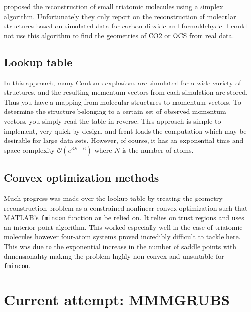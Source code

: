 \citet{Brichta09} proposed the reconstruction of small triatomic molecules using a simplex algorithm. Unfortunately they only report on the reconstruction of molecular structures based on simulated data for carbon dioxide and formaldehyde. I could not use this algorithm to find the geometries of CO2 or OCS from real data.

\subsection{Lookup table}
In this approach, many Coulomb explosions are simulated for a wide variety of structures, and the resulting momentum vectors from each simulation are stored. Thus you have a mapping from molecular structures to momentum vectors. To determine the structure belonging to a certain set of observed momentum vectors, you simply read the table in reverse. This approach is simple to implement, very quick by design, and front-loads the computation which may be desirable for large data sets. However, of course, it has an exponential time and space complexity $\mathcal{O}(e^{3N-6})$ where $N$ is the number of atoms.

\subsection{Convex optimization methods}
Much progress was made over the lookup table by treating the geometry reconstruction problem as a constrained nonlinear convex optimization such that MATLAB's \texttt{fmincon} function an be relied on. It relies on trust regions and uses an interior-point algorithm. This worked especially well in the case of triatomic molecules however four-atom systems proved incredibly difficult to tackle here. This was due to the exponential increase in the number of saddle points with dimensionality  making the problem highly non-convex and unsuitable for \texttt{fmincon}.

\section{Current attempt: MMMGRUBS}
